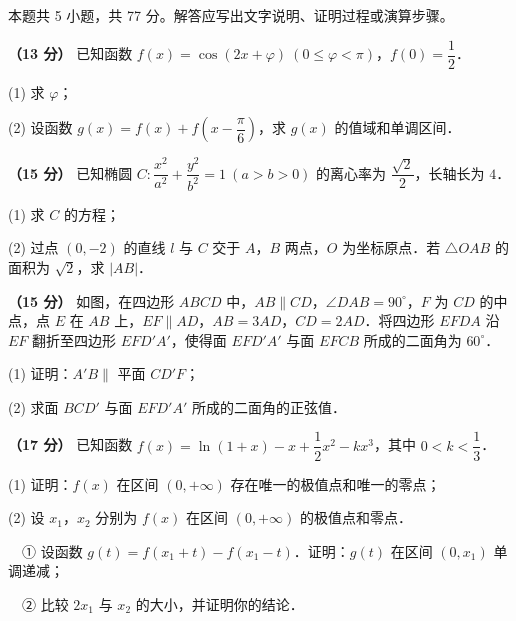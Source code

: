 \begin{gktip}
本题共 5 小题，共 77 分。解答应写出文字说明、证明过程或演算步骤。
\end{gktip}

\begin{question}
\textbf{（13 分）} 已知函数 $f(x)=\cos(2x+\varphi)\ (0\le\varphi<\pi)$，$f(0)=\dfrac12$．

  (1) 求 $\varphi$；

  (2) 设函数 $g(x)=f(x)+f\left(x-\dfrac{\pi}{6}\right)$，求 $g(x)$ 的值域和单调区间．

\end{question}
\begin{question}
\textbf{（15 分）} 已知椭圆 $C:\dfrac{x^2}{a^2}+\dfrac{y^2}{b^2}=1\ (a>b>0)$ 的离心率为 $\dfrac{\sqrt2}{2}$，长轴长为 $4$．

  (1) 求 $C$ 的方程；

  (2) 过点 $(0,-2)$ 的直线 $l$ 与 $C$ 交于 $A$，$B$ 两点，$O$ 为坐标原点．若 $\triangle OAB$ 的面积为 $\sqrt2$，求 $|AB|$．

\Needspace{0.4\textheight}
\end{question}
\begin{question}
\textbf{（15 分）} 如图，在四边形 $ABCD$ 中，$AB\parallel CD$，$\angle DAB=90^\circ$，$F$ 为 $CD$ 的中点，点 $E$ 在 $AB$ 上，$EF\parallel AD$，$AB=3AD$，$CD=2AD$．将四边形 $EFDA$ 沿 $EF$ 翻折至四边形 $EFD'A'$，使得面 $EFD'A'$ 与面 $EFCB$ 所成的二面角为 $60^\circ$．
\nopagebreak[4]
\begin{center}\end{center}
\nopagebreak[4]
  (1) 证明：$A'B\parallel$ 平面 $CD'F$；

  (2) 求面 $BCD'$ 与面 $EFD'A'$ 所成的二面角的正弦值．

\end{question}
\begin{question}
\textbf{（17 分）} 已知函数 $f(x)=\ln(1+x)-x+\dfrac12x^2-kx^3$，其中 $0<k<\dfrac13$．

  (1) 证明：$f(x)$ 在区间 $(0,+\infty)$ 存在唯一的极值点和唯一的零点；

  (2) 设 $x_1$，$x_2$ 分别为 $f(x)$ 在区间 $(0,+\infty)$ 的极值点和零点．

  　① 设函数 $g(t)=f(x_1+t)-f(x_1-t)$．证明：$g(t)$ 在区间 $(0,x_1)$ 单调递减；

  　② 比较 $2x_1$ 与 $x_2$ 的大小，并证明你的结论．

\end{question}
